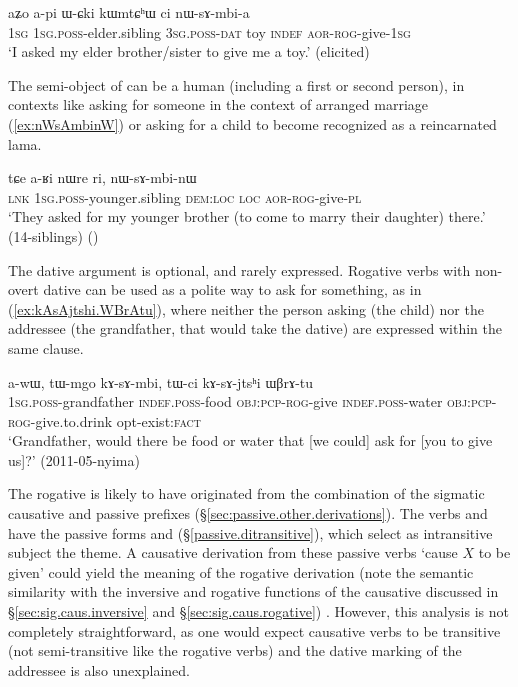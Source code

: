 \begin{exe}
\ex \label{ex:nWsAmbia}
\gll aʑo a-pi ɯ-ɕki kɯmtɕʰɯ ci nɯ-sɤ-mbi-a \\
\textsc{1sg} \textsc{1sg}.\textsc{poss}-elder.sibling \textsc{3sg}.\textsc{poss}-\textsc{dat} toy \textsc{indef} \textsc{aor}-\textsc{rog}-give-\textsc{1sg} \\
\glt `I asked my elder brother/sister to give me a toy.' (elicited)
\end{exe}

The semi-object of  can be a human (including a first or second person), in contexts like asking for someone in the context of arranged marriage (\ref{ex:nWsAmbinW}) or asking for a child to become recognized as a reincarnated lama.

\begin{exe}
\ex \label{ex:nWsAmbinW}
\gll tɕe a-ʁi nɯre ri, nɯ-sɤ-mbi-nɯ \\
\textsc{lnk} \textsc{1sg}.\textsc{poss}-younger.sibling \textsc{dem}:\textsc{loc} \textsc{loc} \textsc{aor}-\textsc{rog}-give-\textsc{pl} \\
\glt `They asked for my younger brother (to come to marry their daughter) there.' (14-siblings) ()
\end{exe}

The dative argument is optional, and rarely expressed. Rogative verbs with non-overt dative can be used as a polite way to ask for something, as in  (\ref{ex:kAsAjtshi.WBrAtu}), where neither the person asking (the child) nor the addressee (the grandfather, that would take the dative) are expressed within the same clause.

\begin{exe}
\ex \label{ex:kAsAjtshi.WBrAtu}
\gll  a-wɯ, tɯ-mgo kɤ-sɤ-mbi, tɯ-ci kɤ-sɤ-jtsʰi ɯβrɤ-tu \\
\textsc{1sg}.\textsc{poss}-grandfather \textsc{indef}.\textsc{poss}-food \textsc{obj}:\textsc{pcp}-\textsc{rog}-give \textsc{indef}.\textsc{poss}-water \textsc{obj}:\textsc{pcp}-\textsc{rog}-give.to.drink opt-exist:\textsc{fact} \\
\glt `Grandfather, would there be food or water that [we could] ask for [you to give us]?' (2011-05-nyima)
\end{exe}

The rogative  is likely to have originated from the combination of the sigmatic causative   and passive    prefixes (§\ref{sec:passive.other.derivations}). The verbs  and   have the passive forms  and   (§\ref{passive.ditransitive}), which select as intransitive subject the theme. A causative derivation from these passive verbs `cause $X$ to be given' could yield the meaning of the rogative derivation (note the semantic similarity with the inversive and rogative functions of the causative discussed in §\ref{sec:sig.caus.inversive} and §\ref{sec:sig.caus.rogative}) . However, this analysis is not completely straightforward, as one would expect causative verbs to be transitive (not semi-transitive like the rogative verbs) and the dative marking of the addressee is also unexplained.


